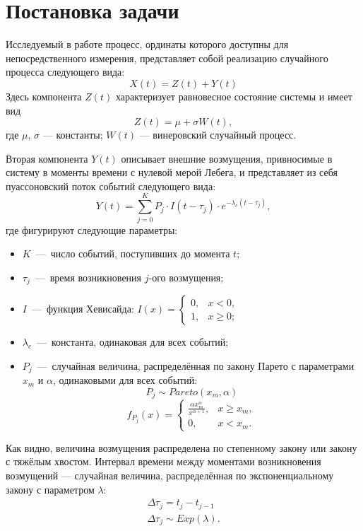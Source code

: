 \chapter{Постановка задачи}	%

Исследуемый в работе процесс, ординаты которого доступны для непосредственного измерения, представляет собой реализацию случайного процесса следующего вида:
\begin{equation}\label{eq:model}
X(t) = Z(t) + Y(t)
\end{equation}
Здесь компонента $Z(t)$ характеризует равновесное состояние системы и имеет вид
\begin{equation}\label{eq:mod_wiener}
Z(t) = \mu + \sigma W(t),
\end{equation}
где
$\mu$, $\sigma$ --- константы; $W(t)$ --- винеровский случайный процесс.

Вторая компонента $Y(t)$ описывает внешние возмущения, привносимые в систему в моменты времени с нулевой мерой Лебега, и представляет из себя пуассоновский поток событий следующего вида:
\begin{equation}\label{eq:mod_markovsky}
Y(t) = \sum_{j = 0}^K P_j \cdot I(t - \tau_j) \cdot e^{-\lambda_c(t - \tau_j)},
\end{equation}
где фигурируют следующие параметры:
\begin{itemize}
\item $K$~---~число событий, поступивших до момента $t$;
\item $\tau_j$~---~время возникновения $j$-ого возмущения;
\item $I$~---~функция Хевисайда: $I(x) = \begin{cases}
0, &x < 0, \\
1, &x \geq 0;
\end{cases}$
\item $\lambda_c$~---~константа, одинаковая для всех событий;
\item $P_j$~---~случайная величина, распределённая по закону Парето с параметрами $x_m$ и $\alpha$, одинаковыми для всех событий:
\[ P_j \sim Pareto(x_m, \alpha) \]
\[
f_{P_j}(x) = \begin{cases}
\frac{\alpha x_m^\alpha}{x^{\alpha+1} }, &x \geqslant x_m, \\
0, &x < x_m.
\end{cases}
\]
\end{itemize}
Как видно, величина возмущения распределена по степенному закону или закону с тяжёлым хвостом.
Интервал времени между моментами возникновения возмущений --- случайная величина, распределённая по экспоненциальному закону с параметром $\lambda$:
\begin{gather}
\Delta \tau_j = t_j - t_{j-1} \\
\Delta \tau_j \sim Exp(\lambda).
\end{gather}

